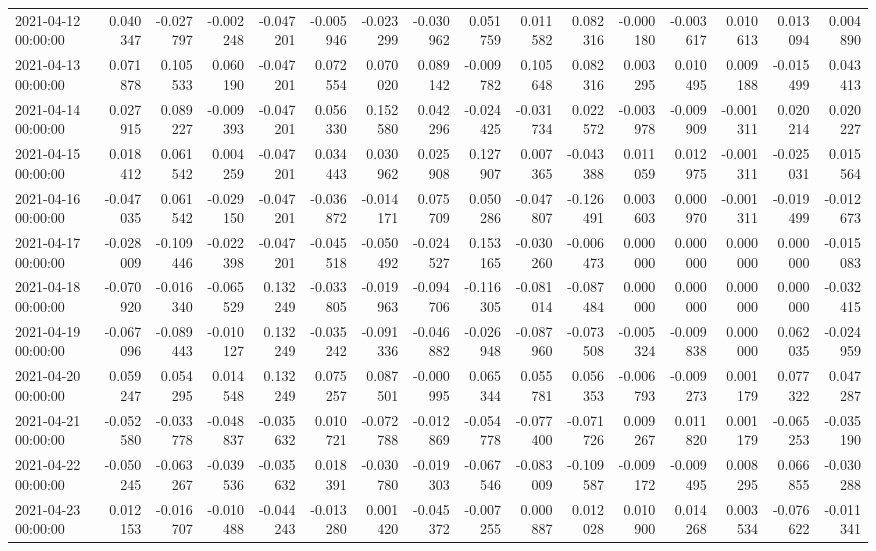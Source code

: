 \begin{tabular}{lrrrrrrrrrrrrrrr}
2021-04-12 00:00:00 & 0.040347 & -0.027797 & -0.002248 & -0.047201 & -0.005946 & -0.023299 & -0.030962 & 0.051759 & 0.011582 & 0.082316 & -0.000180 & -0.003617 & 0.010613 & 0.013094 & 0.004890 \\
2021-04-13 00:00:00 & 0.071878 & 0.105533 & 0.060190 & -0.047201 & 0.072554 & 0.070020 & 0.089142 & -0.009782 & 0.105648 & 0.082316 & 0.003295 & 0.010495 & 0.009188 & -0.015499 & 0.043413 \\
2021-04-14 00:00:00 & 0.027915 & 0.089227 & -0.009393 & -0.047201 & 0.056330 & 0.152580 & 0.042296 & -0.024425 & -0.031734 & 0.022572 & -0.003978 & -0.009909 & -0.001311 & 0.020214 & 0.020227 \\
2021-04-15 00:00:00 & 0.018412 & 0.061542 & 0.004259 & -0.047201 & 0.034443 & 0.030962 & 0.025908 & 0.127907 & 0.007365 & -0.043388 & 0.011059 & 0.012975 & -0.001311 & -0.025031 & 0.015564 \\
2021-04-16 00:00:00 & -0.047035 & 0.061542 & -0.029150 & -0.047201 & -0.036872 & -0.014171 & 0.075709 & 0.050286 & -0.047807 & -0.126491 & 0.003603 & 0.000970 & -0.001311 & -0.019499 & -0.012673 \\
2021-04-17 00:00:00 & -0.028009 & -0.109446 & -0.022398 & -0.047201 & -0.045518 & -0.050492 & -0.024527 & 0.153165 & -0.030260 & -0.006473 & 0.000000 & 0.000000 & 0.000000 & 0.000000 & -0.015083 \\
2021-04-18 00:00:00 & -0.070920 & -0.016340 & -0.065529 & 0.132249 & -0.033805 & -0.019963 & -0.094706 & -0.116305 & -0.081014 & -0.087484 & 0.000000 & 0.000000 & 0.000000 & 0.000000 & -0.032415 \\
2021-04-19 00:00:00 & -0.067096 & -0.089443 & -0.010127 & 0.132249 & -0.035242 & -0.091336 & -0.046882 & -0.026948 & -0.087960 & -0.073508 & -0.005324 & -0.009838 & 0.000000 & 0.062035 & -0.024959 \\
2021-04-20 00:00:00 & 0.059247 & 0.054295 & 0.014548 & 0.132249 & 0.075257 & 0.087501 & -0.000995 & 0.065344 & 0.055781 & 0.056353 & -0.006793 & -0.009273 & 0.001179 & 0.077322 & 0.047287 \\
2021-04-21 00:00:00 & -0.052580 & -0.033778 & -0.048837 & -0.035632 & 0.010721 & -0.072788 & -0.012869 & -0.054778 & -0.077400 & -0.071726 & 0.009267 & 0.011820 & 0.001179 & -0.065253 & -0.035190 \\
2021-04-22 00:00:00 & -0.050245 & -0.063267 & -0.039536 & -0.035632 & 0.018391 & -0.030780 & -0.019303 & -0.067546 & -0.083009 & -0.109587 & -0.009172 & -0.009495 & 0.008295 & 0.066855 & -0.030288 \\
2021-04-23 00:00:00 & 0.012153 & -0.016707 & -0.010488 & -0.044243 & -0.013280 & 0.001420 & -0.045372 & -0.007255 & 0.000887 & 0.012028 & 0.010900 & 0.014268 & 0.003534 & -0.076622 & -0.011341 \\

\end{tabular}
